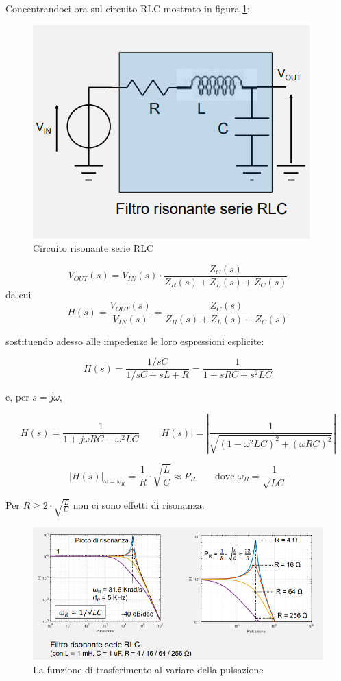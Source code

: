 \documentclass{article}
\begin{document}
\clearpage
Concentrandoci ora sul circuito RLC mostrato in figura \ref{Schema_circuito_risonante_serie_RLC}:

\begin{figure}[h]
  \centering
  \includegraphics[scale=0.5]{IM_circuito_risonante_serie_RLC}
  \caption{Circuito risonante serie RLC}
  \label{Schema_circuito_risonante_serie_RLC}
\end{figure}
\[V_{OUT}(s) = V_{IN}(s) \cdot \frac{Z_C(s)}{Z_R(s) + Z_L(s) + Z_C(s)}\]
da cui
\[H(s) = \frac{V_{OUT} (s)}{V_{IN} (s)} = \frac{Z_C(s)}{Z_R(s) + Z_L(s) + Z_C(s)}\]

sostituendo adesso alle impedenze le loro espressioni esplicite:

\[H(s) = \frac{1/sC}{1/sC + sL + R} = \frac{1}{1 + sRC + s^2 LC}\]

e, per $s = j\omega$, 

\[H(s) = \frac{1}{1 + j \omega RC - \omega ^2 LC} \quad \quad |H(s)| = \left| \frac{1}{\sqrt{(1 - \omega ^2 LC)^2 + (\omega RC)^2}} \right| \]

\[|H(s)|_{\omega = \omega_R} = \frac{1}{R} \cdot \sqrt{\frac{L}{C}} \approx P_R \quad \quad \textrm{dove } \omega _R = \frac{1}{\sqrt{LC}}\]

Per $R \geq 2 \cdot \sqrt{\frac{L}{C}}$ non ci sono effetti di risonanza.

\begin{figure}[h]
  \centering
  \includegraphics[scale=0.5]{IM_circuito_risonante_serie_RLC_grafici}
  \caption{La funzione di trasferimento al variare della pulsazione}
  \label{Schema_circuito_risonante_serie_RLC_grafici}
\end{figure}
\end{document}
